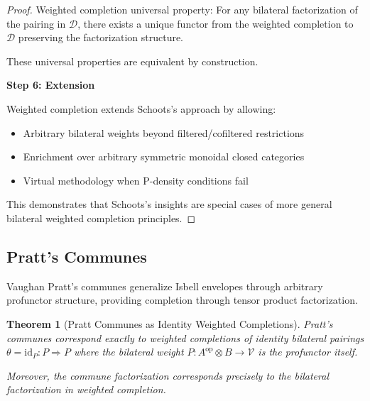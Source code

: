\documentclass[11pt]{article}
\theoremstyle{plain}
\newtheorem{theorem}{Theorem}[section]
\theoremstyle{definition}
\theoremstyle{remark}
\newcommand{\V}{\mathcal{V}}
\newcommand{\op}{\mathrm{op}}
\begin{document}
\begin{proof}
Weighted completion universal property: For any bilateral factorization of the pairing in $\mathcal{D}$, there exists a unique functor from the weighted completion to $\mathcal{D}$ preserving the factorization structure.

These universal properties are equivalent by construction.

\textbf{Step 6: Extension}

Weighted completion extends Schoots's approach by allowing:
\begin{itemize}
\item Arbitrary bilateral weights beyond filtered/cofiltered restrictions
\item Enrichment over arbitrary symmetric monoidal closed categories
\item Virtual methodology when P-density conditions fail
\end{itemize}

This demonstrates that Schoots's insights are special cases of more general bilateral weighted completion principles.
\end{proof}

\subsection{Pratt's Communes}

Vaughan Pratt's communes \cite{pratt2010communes} generalize Isbell envelopes through arbitrary profunctor structure, providing completion through tensor product factorization.

\begin{theorem}[Pratt Communes as Identity Weighted Completions]\label{thm:pratt-correspondence}
Pratt's communes correspond exactly to weighted completions of identity bilateral pairings $\theta = \text{id}_P : P \Rightarrow P$ where the bilateral weight $P : A^{\op} \otimes B \to \V$ is the profunctor itself.

Moreover, the commune factorization corresponds precisely to the bilateral factorization in weighted completion.
\end{theorem}
\end{document}

